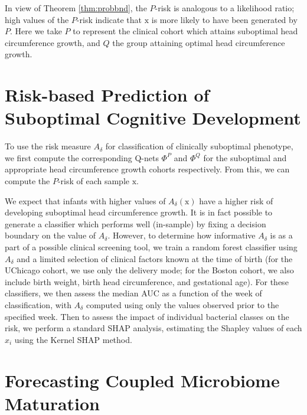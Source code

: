 \documentclass[onecolumn,10pt]{IEEEtran}
\def\x{\bm{\mathrm{x}}}
\def\qnet{Q-net\xspace}
\def\x{\bm{\mathrm{x}}}
\def\RHO{A_\delta}
\begin{document}
In view of Theorem \ref{thm:probbnd}, the $P$-risk is analogous to a likelihood ratio; high values of the $P$-risk indicate that $\x$ is more likely to have been generated by $P$.  Here we take $P$ to represent the clinical cohort which attains suboptimal head circumference growth, and $Q$ the group attaining optimal head circumference growth.


\section{Risk-based Prediction of Suboptimal Cognitive Development}

To use the risk measure $\RHO$ for classification of clinically suboptimal phenotype, we first compute the corresponding {\qnet}s $\Phi^P$ and $\Phi^Q$ for the suboptimal and appropriate head circumference growth cohorts respectively. From this, we can compute the $P$-risk of each sample $\x$.

We expect that infants with higher values of $\RHO(\x)$ have a higher risk of developing suboptimal head circumference growth.  It is in fact possible to generate a classifier which performs well (in-sample) by fixing a decision boundary on the value of $\RHO$.  However, to determine how informative $\RHO$ is as a part of a possible clinical screening tool, we train a random forest classifier using $\RHO$ and a limited selection of clinical factors known at the time of birth (for the UChicago cohort, we use only the delivery mode; for the Boston cohort, we also include birth weight, birth head circumference, and gestational age).  For these classifiers, we then assess the median AUC as a function of the week of classification, with $\RHO$ computed using only the values observed prior to the specified week.  %
Then to assess the impact of individual bacterial classes on the risk, we perform a standard SHAP analysis, estimating the Shapley values of each $x_i$ using the Kernel SHAP\cite{NIPS2017_7062} method.

\section{Forecasting Coupled  Microbiome Maturation}
\label{sec:forecast}
\end{document}

